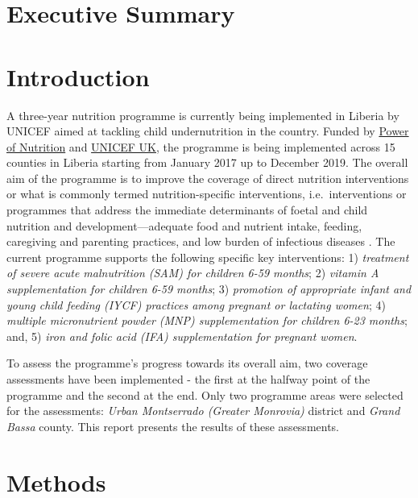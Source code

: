 \documentclass[12pt,a4paper]{article}
\begin{document}
\newpage

\hypertarget{executive-summary}{%
\section*{Executive Summary}\label{executive-summary}}

\newpage

\hypertarget{intro}{%
\section{Introduction}\label{intro}}

A three-year nutrition programme is currently being implemented in Liberia by UNICEF aimed at tackling child undernutrition in the country. Funded by \href{http://www.powerofnutrition.org}{Power of Nutrition} and \href{https://www.unicef.org.uk}{UNICEF UK}, the programme is being implemented across 15 counties in Liberia starting from January 2017 up to December 2019. The overall aim of the programme is to improve the coverage of direct nutrition interventions or what is commonly termed nutrition-specific interventions, i.e.~interventions or programmes that address the immediate determinants of foetal and child nutrition and development---adequate food and nutrient intake, feeding, caregiving and parenting practices, and low burden of infectious diseases \citep{Bhutta:2013ks, Ruel:2013kr}. The current programme supports the following specific key interventions: 1) \emph{treatment of severe acute malnutrition (SAM) for children 6-59 months}; 2) \emph{vitamin A supplementation for children 6-59 months}; 3) \emph{promotion of appropriate infant and young child feeding (IYCF) practices among pregnant or lactating women}; 4) \emph{multiple micronutrient powder (MNP) supplementation for children 6-23 months}; and, 5) \emph{iron and folic acid (IFA) supplementation for pregnant women}.

To assess the programme's progress towards its overall aim, two coverage assessments have been implemented - the first at the halfway point of the programme and the second at the end. Only two programme areas were selected for the assessments: \emph{Urban Montserrado (Greater Monrovia)} district and \emph{Grand Bassa} county. This report presents the results of these assessments.

\hypertarget{methods}{%
\section{Methods}\label{methods}}
\end{document}
